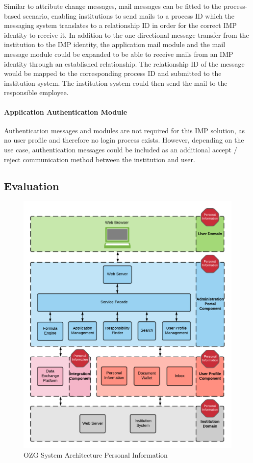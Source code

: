Similar to attribute change messages, mail messages can be fitted to the process-based scenario, enabling institutions to send mails to a process ID which the messaging system translates to a relationship ID in order for the correct IMP identity to receive it. In addition to the one-directional message transfer from the institution to the IMP identity, the application mail module and the mail message module could be expanded to be able to receive mails from an IMP identity through an established relationship. The relationship ID of the message would be mapped to the corresponding process ID and submitted to the institution system. The institution system could then send the mail to the responsible employee.

\paragraph{Application Authentication Module}

Authentication messages and modules are not required for this IMP solution, as no user profile and therefore no login process exists. However, depending on the use case, authentication messages could be included as an additional accept / reject communication method between the institution and user.

\subsection{Evaluation}

\begin{figure}[h]
    \centering
    \includegraphics[scale=0.6]{Diagrams/Integration Architecture 2/OZG Personal Information.pdf}
    \caption{OZG System Architecture Personal Information}
    \label{integration2:ozg_personal_information}
\end{figure}

